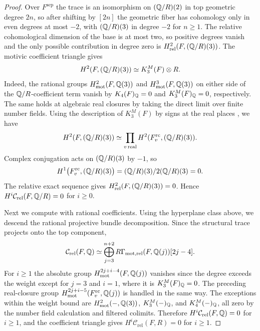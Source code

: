 \begin{proof}
Over $F^{\mathrm{sep}}$ the trace is an isomorphism on $(\mathbb Q/R)(2)$ in top geometric degree $2n$, so after shifting by $[2n]$ the geometric fiber has cohomology only in even degrees at most $-2$, with $(\mathbb Q/R)(3)$ in degree $-2$ for $n\ge1$.
The relative cohomological dimension of the base is at most two, so positive degrees vanish and the only possible contribution in degree zero is $H^2_{\mathrm{rel}}(F,(\mathbb Q/R)(3))$.
The motivic coefficient triangle gives
\[
 H^2(F,(\mathbb Q/R)(3))\simeq K_3^M(F)\otimes R.
\]
Indeed, the rational groups $H^2_{\mathrm{mot}}(F,\mathbb Q(3))$ and $H^3_{\mathrm{mot}}(F,\mathbb Q(3))$ on either side of the $\mathbb Q/R$-coefficient term vanish by $K_4(F)_\mathbb Q=0$ \cite{Borel} and $K_3^M(F)_\mathbb Q=0$, respectively.
The same holds at algebraic real closures by taking the direct limit over finite number fields.
Using the description of $K_3^M(F)$ by signs at the real places \cite{BassTate}, we have
\[
 H^2(F,(\mathbb Q/R)(3))\simeq\prod_{v\,\mathrm{real}}H^2(F_v^{\mathrm{rc}},(\mathbb Q/R)(3)).
\]
Complex conjugation acts on $(\mathbb Q/R)(3)$ by $-1$, so
\[
 H^1\bigl(F_v^{\mathrm{rc}},(\mathbb Q/R)(3)\bigr)=(\mathbb Q/R)(3)/2(\mathbb Q/R)(3)=0.
\]
The relative exact sequence gives $H^2_{\mathrm{rel}}(F,(\mathbb Q/R)(3))=0$.
Hence $H^i\mathcal C_{\mathrm{rel}}(F,\mathbb Q/R)=0$ for $i\ge0$.

Next we compute with rational coefficients.
Using the hyperplane class above, we descend the rational projective bundle decomposition.
Since the structural trace projects onto the top component,
\[
 \mathcal C_{\mathrm{rel}}(F,\mathbb Q)\simeq
 \bigoplus_{j=3}^{n+2}
 R\Gamma_{\mathrm{mot},\mathrm{rel}}(F,\mathbb Q(j))[2j-4].
\]
For $i\ge1$ the absolute group $H^{2j+i-4}_{\mathrm{mot}}(F,\mathbb Q(j))$ vanishes since the degree exceeds the weight except for $j=3$ and $i=1$, where it is $K_3^M(F)_\mathbb Q=0$.
The preceding real-closure group $H^{2j+i-5}_{\mathrm{mot}}(F_v^{\mathrm{rc}},\mathbb Q(j))$ is handled in the same way.
The exceptions within the weight bound are $H^2_{\mathrm{mot}}(-,\mathbb Q(3))$, $K_3^M(-)_\mathbb Q$, and $K_4^M(-)_\mathbb Q$, all zero by the number field calculation and filtered colimits.
Therefore $H^i\mathcal C_{\mathrm{rel}}(F,\mathbb Q)=0$ for $i\ge1$, and the coefficient triangle gives $H^i\mathcal C_{\mathrm{rel}}(F,R)=0$ for $i\ge1$.


\end{proof}
